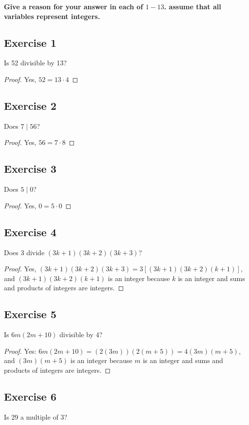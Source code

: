 \documentclass[14pt]{extarticle}
\newcommand{\cy}{\color{cyan}}
\begin{document}
 {\bf \cy Give a reason for your answer in each of $1-13$. assume that all variables represent integers.}

\subsection{Exercise 1}
Is 52 divisible by 13?

\begin{proof}
    Yes, $52 = 13 \cdot 4$
\end{proof}

\subsection{Exercise 2}
Does $7 \mid 56$?

\begin{proof}
    Yes, $56 = 7 \cdot 8$
\end{proof}

\subsection{Exercise 3}
Does $5 \mid 0$?

\begin{proof}
    Yes, $0 = 5 \cdot 0$
\end{proof}

\subsection{Exercise 4}
Does 3 divide $(3k + 1)(3k + 2)(3k + 3)$?

\begin{proof}
    Yes, $(3k + 1)(3k + 2)(3k + 3) = 3[(3k + 1)(3k + 2)
                (k + 1)]$, and $(3k + 1)(3k + 2)(k + 1)$ is an integer because $k$ is an integer and sums and products of integers
    are integers.
\end{proof}

\subsection{Exercise 5}
Is $6m(2m + 10)$ divisible by 4?

\begin{proof}
    Yes: $6m(2m + 10) = (2(3m))(2(m + 5)) = 4(3m)(m + 5)$, and $(3m)(m + 5)$ is an integer because $m$ is an integer and sums and products of integers are integers.
\end{proof}

\subsection{Exercise 6}
Is 29 a multiple of 3?
\end{document}

